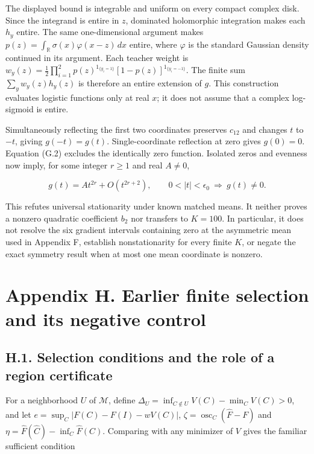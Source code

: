 \documentclass{article}
\begin{document}
The displayed bound is integrable and uniform on every compact complex
disk. Since the integrand is entire in \(z\), dominated holomorphic
integration makes each \(h_y\) entire. The same one-dimensional argument
makes \(p(z)=\int_{\mathbb R}\sigma(x)\varphi(x-z)\,dx\) entire, where
\(\varphi\) is the standard Gaussian density continued in its argument.
Each teacher weight is
\(w_y(z)=\tfrac12\prod_{i=1}^2p(z)^{1_{\{y_i=1\}}}[1-p(z)]^{1_{\{y_i=-1\}}}\).
The finite sum \(\sum_yw_y(z)h_y(z)\) is therefore an entire extension
of \(g\). This construction evaluates logistic functions only at real
\(x\); it does not assume that a complex log-sigmoid is entire.

Simultaneously reflecting the first two coordinates preserves \(c_{12}\)
and changes \(t\) to \(-t\), giving \(g(-t)=g(t)\). Single-coordinate
reflection at zero gives \(g(0)=0\). Equation (G.2) excludes the
identically zero function. Isolated zeros and evenness now imply, for
some integer \(r\ge1\) and real \(A\ne0\),

\[
g(t)=At^{2r}+O(t^{2r+2}),\qquad
0<|t|<\epsilon_0\ \Longrightarrow\ g(t)\ne0.
\tag{G.15}
\]

This refutes universal stationarity under known matched means. It
neither proves a nonzero quadratic coefficient \(b_2\) nor transfers to
\(K=100\). In particular, it does not resolve the six gradient intervals
containing zero at the asymmetric mean used in Appendix F, establish
nonstationarity for every finite \(K\), or negate the exact symmetry
result when at most one mean coordinate is nonzero.

\clearpage

\section*{Appendix H. Earlier finite selection and its negative
control}\label{appendix-h.-earlier-finite-selection-and-its-negative-control}

\subsection*{H.1. Selection conditions and the role of a region
certificate}\label{h.1.-selection-conditions-and-the-role-of-a-region-certificate}

For a neighborhood \(U\) of \(\mathcal M\), define
\(\Delta_U=\inf_{C\notin U}V(C)-\min_CV(C)>0\), and let
\(e=\sup_C|F(C)-F(I)-wV(C)|\),
\(\zeta=\operatorname{osc}_C(\widehat F-F)\) and
\(\eta=\widehat F(\widehat C)-\inf_C\widehat F(C)\). Comparing with any
minimizer of \(V\) gives the familiar sufficient condition
\end{document}
